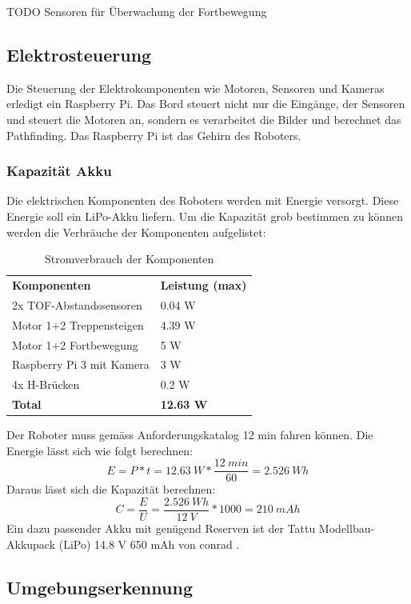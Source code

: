 TODO Sensoren für Überwachung der Fortbewegung

\newpage
\subsection{Elektrosteuerung}
Die Steuerung der Elektrokomponenten wie Motoren, Sensoren und Kameras erledigt ein Raspberry Pi. Das Bord steuert nicht nur die Eingänge, der Sensoren und steuert die Motoren an, sondern es verarbeitet die Bilder und berechnet das Pathfinding. Das Raspberry Pi ist das Gehirn des Roboters.

\subsubsection{Kapazität Akku}
Die elektrischen Komponenten des Roboters werden mit Energie versorgt. Diese Energie soll ein LiPo-Akku liefern. Um die Kapazität grob bestimmen zu können werden die Verbräuche der Komponenten aufgelistet:   

\begin{table}[h!]
\centering
\begin{tabular}{ l l }
 \textbf{Komponenten} & \textbf{Leistung (max)} \\
 2x TOF-Abstandssensoren & 0.04 W \\ 
 Motor 1+2 Treppensteigen & 4.39 W \\  
 Motor 1+2 Fortbewegung & 5 W \\
 Raspberry Pi 3 mit Kamera & 3 W \\
 4x H-Brücken & 0.2 W \\
 \textbf{Total} & \textbf{12.63 W}
\end{tabular}
\caption{Stromverbrauch der Komponenten}
\end{table}

Der Roboter muss gemäss Anforderungskatalog 12 min fahren können. Die Energie lässt sich wie folgt berechnen:
\[E = P * t = 12.63\ W * \frac{12\ min}{60} = 2.526\ Wh\]
Daraus lässt sich die Kapazität berechnen:
\[C = \frac{E}{U} = \frac{2.526\ Wh}{12\ V} * 1000 = 210\ mAh\]
Ein dazu passender Akku mit genügend Reserven ist der Tattu Modellbau-Akkupack (LiPo) 14.8 V 650 mAh von conrad \cite{Akku}.


\newpage
\subsection{Umgebungserkennung}

